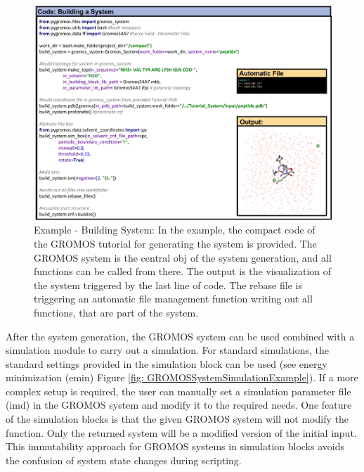 \begin{figure}[h]
    \centering
    \includegraphics[width=\textwidth]{fig/ApplicationExamples/codeExample_GROMOSSystemSolvBoxTut.png}
    \caption{Example - Building System: In the example, the compact code of the GROMOS tutorial for generating the system is provided. The GROMOS system is the central obj of the system generation, and all functions can be called from there. The output is the visualization of the system triggered by the last line of code. The rebase file is triggering an automatic file management function writing out all functions, that are part of the system.}
    \label{fig: GROMOSSystemExample}
\end{figure}
After the system generation, the GROMOS system can be used combined with a simulation module to carry out a simulation. For standard simulations, the standard settings provided in the simulation block can be used (see energy minimization (emin) Figure \ref{fig: GROMOSSystemSimulationExample}). If a more complex setup is required, the user can manually set a simulation parameter file (imd) in the GROMOS system and modify it to the required needs. One feature of the simulation blocks is that the given GROMOS system will not modify the function. Only the returned system will be a modified version of the initial input. This immutability approach for GROMOS systems in simulation blocks avoids the confusion of system state changes during scripting. 

